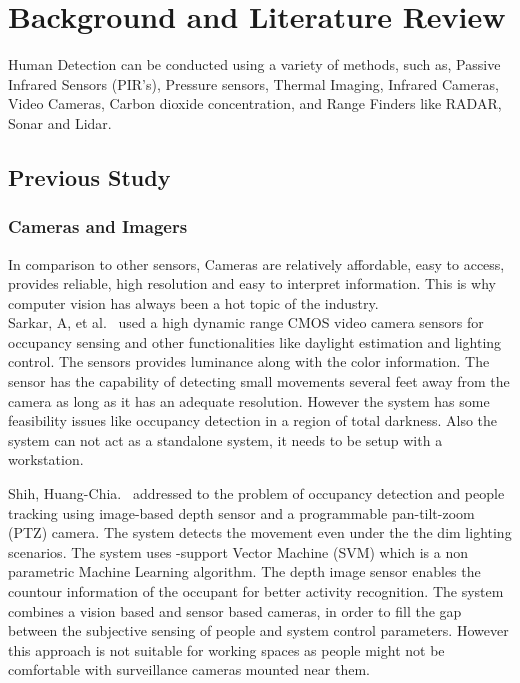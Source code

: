 \chapter{Background and Literature Review}
\label{chapter:background} 

Human Detection can be conducted using a variety of methods, such as, Passive Infrared Sensors (PIR's), Pressure sensors, Thermal Imaging, Infrared Cameras, Video Cameras, Carbon dioxide concentration, and Range Finders like RADAR, Sonar and Lidar.

\section{Previous Study}
\subsection{Cameras and Imagers}
In comparison to other sensors, Cameras are relatively affordable, easy to access, provides reliable, high resolution and easy to interpret information. This is why computer vision has always been a hot topic of the industry.
\\

Sarkar, A, et al.~\cite{sarkar2008integrated} used a high dynamic range CMOS video camera sensors for occupancy sensing and other functionalities like daylight estimation and lighting control. The sensors provides luminance along with the color information. The sensor has the capability of detecting small movements several feet away from the camera as long as it has an adequate resolution. However the system has some feasibility issues like occupancy detection in a region of total darkness. Also the system can not act as a standalone system, it needs to be setup with a workstation.

Shih, Huang-Chia.~\cite{shih2014robust} addressed to the problem of occupancy detection and people  tracking using image-based depth sensor and a programmable pan-tilt-zoom (PTZ) camera.
The system detects the movement even under the the dim lighting scenarios. The system uses -support Vector Machine (SVM) which is a non parametric Machine Learning algorithm. The depth image sensor enables the countour information of the occupant for better activity recognition. The system combines a vision based and sensor based cameras, in order to fill the gap between the subjective sensing of people and system control parameters. 
However this approach is not suitable for working spaces as people might not be comfortable with surveillance cameras mounted near them.
\\

